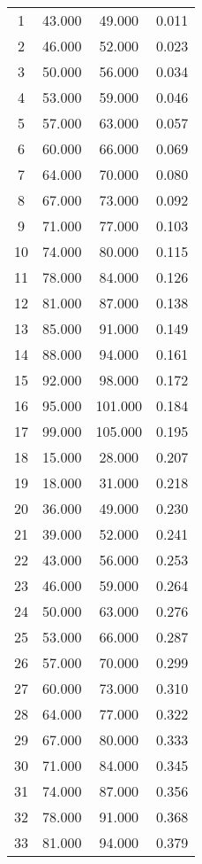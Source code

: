 % 
\begin{tabular}{cccc}
  \hline
  \hline
1 & 43.000 & 49.000 & 0.011 \\ 
  2 & 46.000 & 52.000 & 0.023 \\ 
  3 & 50.000 & 56.000 & 0.034 \\ 
  4 & 53.000 & 59.000 & 0.046 \\ 
  5 & 57.000 & 63.000 & 0.057 \\ 
  6 & 60.000 & 66.000 & 0.069 \\ 
  7 & 64.000 & 70.000 & 0.080 \\ 
  8 & 67.000 & 73.000 & 0.092 \\ 
  9 & 71.000 & 77.000 & 0.103 \\ 
  10 & 74.000 & 80.000 & 0.115 \\ 
  11 & 78.000 & 84.000 & 0.126 \\ 
  12 & 81.000 & 87.000 & 0.138 \\ 
  13 & 85.000 & 91.000 & 0.149 \\ 
  14 & 88.000 & 94.000 & 0.161 \\ 
  15 & 92.000 & 98.000 & 0.172 \\ 
  16 & 95.000 & 101.000 & 0.184 \\ 
  17 & 99.000 & 105.000 & 0.195 \\ 
  18 & 15.000 & 28.000 & 0.207 \\ 
  19 & 18.000 & 31.000 & 0.218 \\ 
  20 & 36.000 & 49.000 & 0.230 \\ 
  21 & 39.000 & 52.000 & 0.241 \\ 
  22 & 43.000 & 56.000 & 0.253 \\ 
  23 & 46.000 & 59.000 & 0.264 \\ 
  24 & 50.000 & 63.000 & 0.276 \\ 
  25 & 53.000 & 66.000 & 0.287 \\ 
  26 & 57.000 & 70.000 & 0.299 \\ 
  27 & 60.000 & 73.000 & 0.310 \\ 
  28 & 64.000 & 77.000 & 0.322 \\ 
  29 & 67.000 & 80.000 & 0.333 \\ 
  30 & 71.000 & 84.000 & 0.345 \\ 
  31 & 74.000 & 87.000 & 0.356 \\ 
  32 & 78.000 & 91.000 & 0.368 \\ 
  33 & 81.000 & 94.000 & 0.379 \\ 

\end{tabular}
